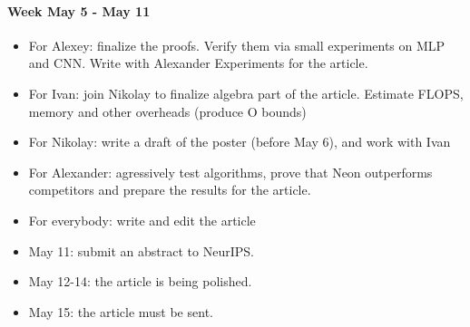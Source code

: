 \documentclass{article} %
\begin{document}
\paragraph{Week May 5 - May 11}
\begin{itemize}
    \item For Alexey: finalize the proofs. Verify them via small experiments on MLP and CNN. Write with Alexander Experiments for the article.
    
    \item For Ivan: join Nikolay to finalize algebra part of the article. Estimate FLOPS, memory and other overheads (produce O bounds)
    
    \item For Nikolay: write a draft of the poster (before May 6), and work with Ivan
    
    \item For Alexander: agressively test algorithms, prove that Neon outperforms competitors and prepare the results for the article.
    
    \item For everybody: write and edit the article
    
    \item May 11: submit an abstract to NeurIPS.
    
    \item May 12-14: the article is being polished.
    
    \item May 15: the article must be sent.
\end{itemize}
\end{document}
